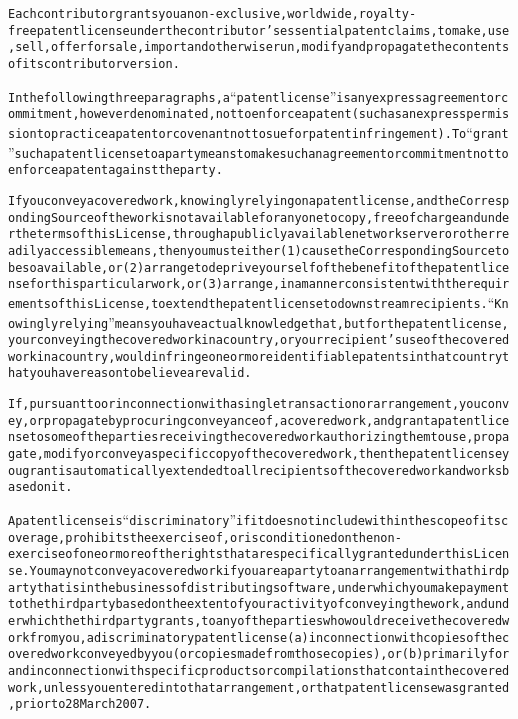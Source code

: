 \begin{alltt}
Each contributor grants you a non-exclusive, worldwide, royalty-free patent license under the contributor's essential patent claims, to make, use, sell, offer for sale, import and otherwise run, modify and propagate the contents of its contributor version.

In the following three paragraphs, a “patent license” is any express agreement or commitment, however denominated, not to enforce a patent (such as an express permission to practice a patent or covenant not to sue for patent infringement). To “grant” such a patent license to a party means to make such an agreement or commitment not to enforce a patent against the party.

If you convey a covered work, knowingly relying on a patent license, and the Corresponding Source of the work is not available for anyone to copy, free of charge and under the terms of this License, through a publicly available network server or other readily accessible means, then you must either (1) cause the Corresponding Source to be so available, or (2) arrange to deprive yourself of the benefit of the patent license for this particular work, or (3) arrange, in a manner consistent with the requirements of this License, to extend the patent license to downstream recipients. “Knowingly relying” means you have actual knowledge that, but for the patent license, your conveying the covered work in a country, or your recipient's use of the covered work in a country, would infringe one or more identifiable patents in that country that you have reason to believe are valid.

If, pursuant to or in connection with a single transaction or arrangement, you convey, or propagate by procuring conveyance of, a covered work, and grant a patent license to some of the parties receiving the covered work authorizing them to use, propagate, modify or convey a specific copy of the covered work, then the patent license you grant is automatically extended to all recipients of the covered work and works based on it.

A patent license is “discriminatory” if it does not include within the scope of its coverage, prohibits the exercise of, or is conditioned on the non-exercise of one or more of the rights that are specifically granted under this License. You may not convey a covered work if you are a party to an arrangement with a third party that is in the business of distributing software, under which you make payment to the third party based on the extent of your activity of conveying the work, and under which the third party grants, to any of the parties who would receive the covered work from you, a discriminatory patent license (a) in connection with copies of the covered work conveyed by you (or copies made from those copies), or (b) primarily for and in connection with specific products or compilations that contain the covered work, unless you entered into that arrangement, or that patent license was granted, prior to 28 March 2007.


\end{alltt}
